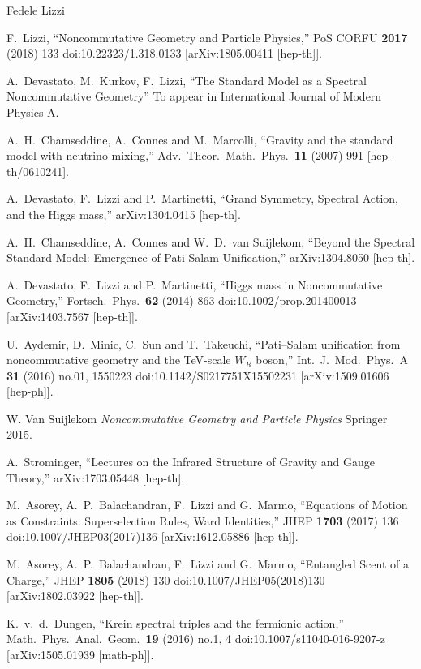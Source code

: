 \begin{artengenv}{Fedele Lizzi}
\begin{thebibliography}{99}
 F.~Lizzi,
  ``Noncommutative Geometry and Particle Physics,''
  PoS CORFU {\bf 2017} (2018) 133
  doi:10.22323/1.318.0133
  [arXiv:1805.00411 [hep-th]].

 A.~Devastato, M.~Kurkov, F.~Lizzi,
  ``The Standard Model as a Spectral Noncommutative Geometry''
  To appear in International Journal of Modern Physics A.
  
     A.~H.~Chamseddine, A.~Connes and M.~Marcolli,
  ``Gravity and the standard model with neutrino mixing,''
  Adv.\ Theor.\ Math.\ Phys.\  {\bf 11} (2007) 991
  [hep-th/0610241].

 A.~Devastato, F.~Lizzi and P.~Martinetti,
  ``Grand Symmetry, Spectral Action, and the Higgs mass,''
  arXiv:1304.0415 [hep-th].

 A.~H.~Chamseddine, A.~Connes and W.~D.~van Suijlekom,
  ``Beyond the Spectral Standard Model: Emergence of Pati-Salam Unification,''
  arXiv:1304.8050 [hep-th].
  
 A.~Devastato, F.~Lizzi and P.~Martinetti,
  ``Higgs mass in Noncommutative Geometry,''
  Fortsch.\ Phys.\  {\bf 62} (2014) 863
  doi:10.1002/prop.201400013
  [arXiv:1403.7567 [hep-th]]. 
  
  U.~Aydemir, D.~Minic, C.~Sun and T.~Takeuchi,
  ``Pati–Salam unification from noncommutative geometry and the TeV-scale $W_R$ boson,''
  Int.\ J.\ Mod.\ Phys.\ A {\bf 31} (2016) no.01,  1550223
  doi:10.1142/S0217751X15502231
  [arXiv:1509.01606 [hep-ph]].

 W. Van Suijlekom \textit{Noncommutative Geometry and Particle Physics} Springer 2015.

  A.~Strominger,
  ``Lectures on the Infrared Structure of Gravity and Gauge Theory,''
  arXiv:1703.05448 [hep-th].

M.~Asorey, A.~P.~Balachandran, F.~Lizzi and G.~Marmo,
  ``Equations of Motion as Constraints: Superselection Rules, Ward Identities,''
  JHEP {\bf 1703} (2017) 136
  doi:10.1007/JHEP03(2017)136
  [arXiv:1612.05886 [hep-th]].

M.~Asorey, A.~P.~Balachandran, F.~Lizzi and G.~Marmo,
  ``Entangled Scent of a Charge,''
  JHEP {\bf 1805} (2018) 130
  doi:10.1007/JHEP05(2018)130
  [arXiv:1802.03922 [hep-th]].

  K.~v.~d.~Dungen,
  ``Krein spectral triples and the fermionic action,''
  Math.\ Phys.\ Anal.\ Geom.\  {\bf 19} (2016) no.1,  4
  doi:10.1007/s11040-016-9207-z
  [arXiv:1505.01939 [math-ph]].


\end{thebibliography}
\end{artengenv}
